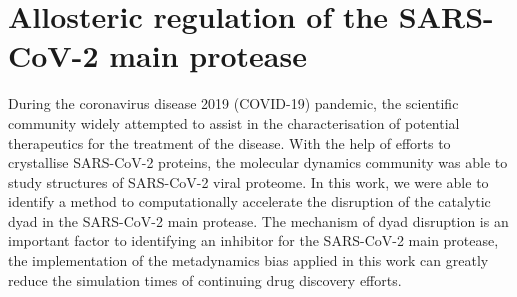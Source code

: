 \chapter{Allosteric regulation of the SARS-CoV-2 main protease}
\label{Corona}


During the coronavirus disease 2019 (COVID-19) pandemic, the scientific community widely attempted to assist in the characterisation of potential therapeutics for the treatment of the disease. With the help of efforts to crystallise SARS-CoV-2 proteins, the molecular dynamics community was able to study structures of SARS-CoV-2 viral proteome. In this work, we were able to identify a method to computationally accelerate the disruption of the catalytic dyad in the SARS-CoV-2 main protease. The mechanism of dyad disruption is an important factor to identifying an inhibitor for the SARS-CoV-2 main protease, the implementation of the metadynamics bias applied in this work can greatly reduce the simulation times of continuing drug discovery efforts. 

%
\clearpage

